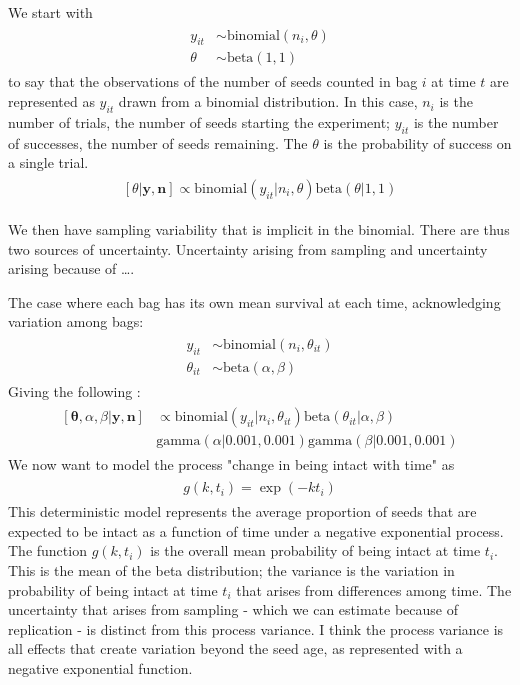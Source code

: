\documentclass[12pt, oneside, titlepage]{article}   	%
\begin{document}
We start with
%
\begin{align}
  \begin{split}
y_{it} &\sim \mathrm{binomial}(n_i, \theta) 
\\ \theta & \sim \mathrm{beta}(1,1)
  \end{split}
\end{align}
% 
to say that the observations of the number of seeds counted in bag $i$ at time $t$ are represented as $y_{it}$ drawn from a binomial distribution. In this case, $n_i$ is the number of trials, the number of seeds starting the experiment; $y_{it}$ is the number of successes, the number of seeds remaining. The $\theta$ is the probability of success on a single trial.
%
\begin{align}
  \begin{split}
[\theta | \bm{y}, \bm{n} ] \propto \mathrm{binomial}(y_{it} | n_i, \theta) \mathrm{beta}(\theta | 1,1)
  \end{split}
\end{align}
%

We then have sampling variability that is implicit in the binomial. There are thus two sources of uncertainty. Uncertainty arising from sampling and uncertainty arising because of \dots. 

The case where each bag has its own mean survival at each time, acknowledging variation among bags:
%
\begin{align}
  \begin{split}
y_{it} &\sim \mathrm{binomial}(n_i, \theta_{it}) 
\\ \theta_{it} & \sim \mathrm{beta}(\alpha,\beta)
  \end{split}
\end{align}
% 
Giving the following :
%
\begin{align}
  \begin{split}
[\bm{\theta}, \alpha, \beta | \bm{y}, \bm{n} ] & \propto \mathrm{binomial}(y_{it} | n_i, \theta_{it}) \mathrm{beta}(\theta _{it}| \alpha, \beta) 
\\ & \mathrm{gamma}( \alpha | 0.001, 0.001) \mathrm{gamma}( \beta | 0.001, 0.001)
  \end{split}
\end{align}
%
We now want to model the process "change in being intact with time" as 
%
\begin{align}
  \begin{split}
g(k,t_i) = \exp(-k t_i)
  \end{split}
\end{align}
% 
This deterministic model represents the average proportion of seeds that are expected to be intact as a function of time under a negative exponential process. The function $g(k,t_i)$ is the overall mean probability of being intact at time $t_i$. This is the mean of the beta distribution; the variance is the variation in probability of being intact at time $t_i$ that arises from differences among time. The uncertainty that arises from sampling - which we can estimate because of replication - is distinct from this process variance. I think the process variance is all effects that create variation beyond the seed age, as represented with a negative exponential function.
\end{document}
